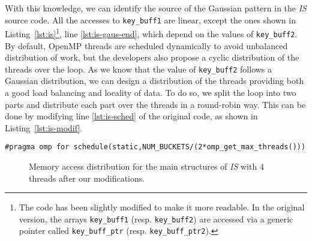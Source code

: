 

With this knowledge, we can identify the source of the
Gaussian pattern in the \emph{IS} source code. All the accesses to \texttt{key\_buff1} are linear,
except the ones shown in Listing~\ref{lst:is}\footnote{
    The code has been slightly modified to make it more readable. In the
    original version, the arrays \texttt{key\_buff1} (resp. \texttt{key\_buff2})
    are accessed via a generic pointer called \texttt{key\_buff\_ptr} (resp.
    \texttt{key\_buff\_ptr2}).
}, line \ref{lst:is-gaus-end}, which depend on the values of
\texttt{key\_buff2}.
By default, OpenMP threads are scheduled dynamically to avoid unbalanced
distribution of work, but the developers also propose a cyclic distribution
of the threads over the loop. As we know that the value of \texttt{key\_buff2}
follows a Gaussian distribution, we can design a distribution of the threads
providing both a good load balancing and locality of data. To do so, we split
the loop into two parts and distribute each part over the threads in a round-robin way. This can be done by modifying line \ref{lst:is-sched} of the original code, as shown
in Listing~\ref{lst:is-modif}.

\begin{lstlisting}[float=!ht,caption=Optimization for \emph{IS}., label=lst:is-modif]
#pragma omp for schedule(static,NUM_BUCKETS/(2*omp_get_max_threads()))
\end{lstlisting}

\begin{figure}[!p]
    \centering


    \vspace{-3mm}

    \vspace{-3mm}

    \vspace{-3mm}
    \caption{Memory access distribution for the main structures of
        \emph{IS} with $4$ threads after our modifications.}
    \label{fig:is-behaviour-modif}
\end{figure}


